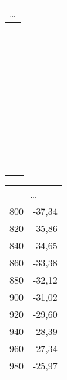 \begin{footnotesize}
\begin{table}[h]
\begin{tabular}{rl}
\multicolumn{2}{c}{\dots}\\
\end{tabular}
\begin{tabular}{c|c}
&\\&\\&\\&\\&\\&\\&\\&\\&\\&\\&\\&\\&\\&\\&\\&\\&\\&\\&\\&\\&\\&\\&\\&\\&\\&\\&\\&\\&\\&\\&\\&\\&\\&\\&\\&\\&\\&\\&\\&\\
\end{tabular}
\begin{tabular}{rl}
\multicolumn{2}{c}{\dots}\\
800	&	-37,34\\
820	&	-35,86\\
840	&	-34,65\\
860	&	-33,38\\
880	&	-32,12\\
900	&	-31,02\\
920	&	-29,60\\
940	&	-28,39\\
960	&	-27,34\\
980	&	-25,97\\

\end{tabular}
\end{table}
\end{footnotesize}
